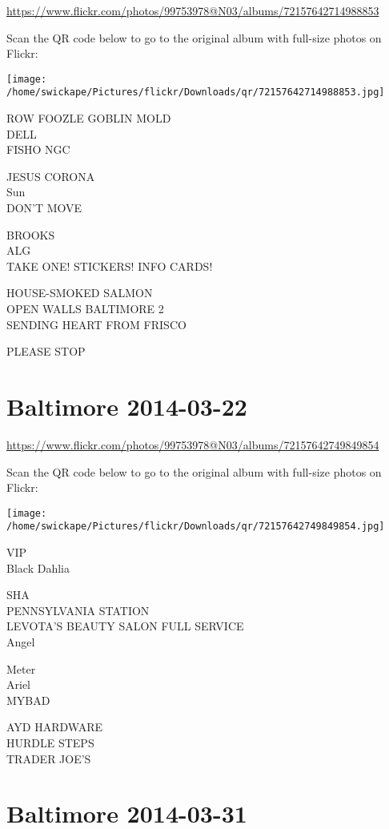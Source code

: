 \documentclass[10pt,letterpaper]{article}
\begin{document}
\url{https://www.flickr.com/photos/99753978@N03/albums/72157642714988853}

Scan the QR code below to go to the original album with full-size photos on Flickr:

\texttt{[image: /home/swickape/Pictures/flickr/Downloads/qr/72157642714988853.jpg]}


ROW FOOZLE GOBLIN MOLD\\
DELL\\
FISHO NGC

JESUS CORONA\\
Sun\\
DON'T MOVE

BROOKS\\
ALG\\
TAKE ONE!  STICKERS!  INFO CARDS!

HOUSE{-}SMOKED SALMON\\
OPEN WALLS BALTIMORE 2\\
SENDING HEART FROM FRISCO

PLEASE STOP


\section*{Baltimore 2014-03-22}

\url{https://www.flickr.com/photos/99753978@N03/albums/72157642749849854}

Scan the QR code below to go to the original album with full-size photos on Flickr:

\texttt{[image: /home/swickape/Pictures/flickr/Downloads/qr/72157642749849854.jpg]}


VIP\\
Black Dahlia

SHA\\
PENNSYLVANIA STATION\\
LEVOTA'S BEAUTY SALON FULL SERVICE\\
Angel

Meter\\
Ariel\\
MYBAD

AYD HARDWARE\\
HURDLE STEPS\\
TRADER JOE'S


\section*{Baltimore 2014-03-31}
\end{document}

